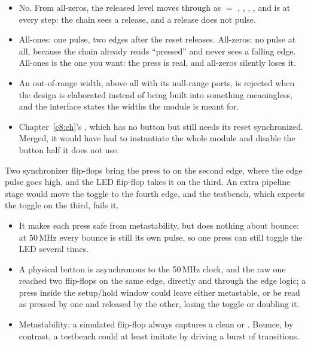 \begin{itemize}
  \item No. From all-zeros, the released level moves through as  $=$ ,
    , , , and  is  at every step: the
    chain sees a release, and a release does not pulse.
  \item All-ones: one pulse, two edges after the reset releases. All-zeros: no pulse at all, because
    the chain already reads ``pressed'' and never sees a falling edge. All-ones is the one you want:
    the press is real, and all-zeros silently loses it.
\end{itemize}
\begin{itemize}
  \item An out-of-range width, above all  with its null-range ports, is rejected
    when the design is elaborated instead of being built into something meaningless, and the
    interface states the widths the module is meant for.
  \item Chapter~\ref{c8:ch}'s , which has no button but still needs its
    reset synchronized. Merged, it would have had to instantiate the whole module and disable the
    button half it does not use.
\end{itemize}

Two synchronizer flip-flops bring the press to  on the second edge, where
the edge pulse goes high, and the LED flip-flop takes it on the third. An extra pipeline stage would
move the toggle to the fourth edge, and the testbench, which expects the toggle on the third, fails
it.
\begin{itemize}
  \item It makes each press safe from metastability, but does nothing about bounce: at 50\,MHz every
    bounce is still its own pulse, so one press can still toggle the LED several times.
  \item A physical button is asynchronous to the 50\,MHz clock, and the raw one reached two
    flip-flops on the same edge,  directly and  through the edge
    logic; a press inside the setup/hold window could leave either metastable, or be read as pressed
    by one and released by the other, losing the toggle or doubling it.
  \item Metastability: a simulated flip-flop always captures a clean  or .
    Bounce, by contrast, a testbench could at least imitate by driving a burst of transitions.
\end{itemize}
